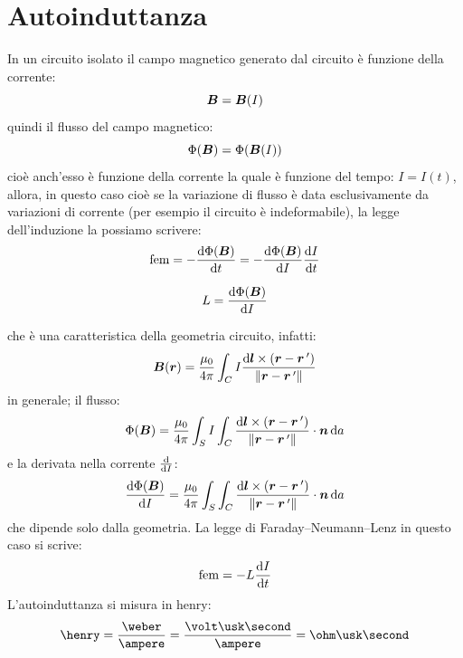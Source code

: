 \section{Autoinduttanza}
In un circuito isolato il campo magnetico generato dal circuito è funzione della corrente:
\begin{equation}
\boldsymbol{B}=\boldsymbol{B}(I)
\end{equation}
quindi il flusso del campo magnetico:
\begin{equation}
\Phi(\boldsymbol{B})=\Phi(\boldsymbol{B}(I))
\end{equation}
cioè anch'esso è funzione della corrente la quale è funzione del tempo: $I=I(t)$, allora, in questo caso cioè se la variazione di flusso è data esclusivamente da variazioni di corrente (per esempio il circuito è indeformabile), la legge dell'induzione la possiamo scrivere:
\begin{equation}
\text{fem}=-\frac{\mathrm{d}\Phi(\boldsymbol{B})}{\mathrm{d} t}=-\frac{\mathrm{d}\Phi(\boldsymbol{B})}{\mathrm{d} I}\frac{\mathrm{d} I}{\mathrm{d} t}
\end{equation}
\begin{Def}
\begin{equation}
L=\frac{\mathrm{d}\Phi(\boldsymbol{B})}{\mathrm{d} I}
\end{equation}
\end{Def}
che è una caratteristica della geometria circuito, infatti:
\begin{equation*}
\boldsymbol{B}(\boldsymbol{r})=\frac{\mu_0}{4\pi}\int_C I\frac{\mathrm{d} \boldsymbol{l}\times\left(\boldsymbol{r}-\boldsymbol{r}\,'\right)}{\left\lVert\boldsymbol{r}-\boldsymbol{r}\,'\right\rVert}
\end{equation*}
in generale; il flusso:
\begin{equation*}
\Phi(\boldsymbol{B})=\frac{\mu_0}{4\pi}\int_S I\int_C\frac{\mathrm{d} \boldsymbol{l}\times\left(\boldsymbol{r}-\boldsymbol{r}\,'\right)}{\left\lVert\boldsymbol{r}-\boldsymbol{r}\,'\right\rVert}\cdot \boldsymbol{n}\,\mathrm{d} a
\end{equation*}
e la derivata nella corrente $\frac{\mathrm{d}}{\mathrm{d} I}$:
\begin{equation*}
\frac{\mathrm{d}\Phi(\boldsymbol{B})}{\mathrm{d} I}=\frac{\mu_0}{4\pi}\int_S\int_C\frac{\mathrm{d} \boldsymbol{l}\times\left(\boldsymbol{r}-\boldsymbol{r}\,'\right)}{\left\lVert\boldsymbol{r}-\boldsymbol{r}\,'\right\rVert}\cdot \boldsymbol{n}\,\mathrm{d} a
\end{equation*}
che dipende solo dalla geometria. La legge di Faraday--Neumann--Lenz in questo caso si scrive:
\begin{equation}
\text{fem}=-L\frac{\mathrm{d} I}{\mathrm{d} t}
\end{equation}
L'autoinduttanza si misura in henry:
\begin{equation*}
\henry=\frac{\weber}{\ampere}=\frac{\volt\usk\second}{\ampere}=\ohm\usk\second
\end{equation*}
